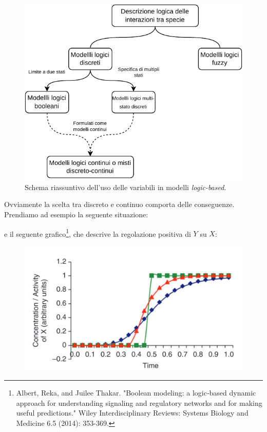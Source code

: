 \documentclass[a4paper,12pt, oneside]{book}
\begin{document}
\begin{figure}
  \centering
  \includegraphics[scale = 1]{img/log.pdf}
  \caption{Schema riassuntivo dell'uso delle variabili in modelli
    \textit{logic-based}.}
  \label{fig:log}
\end{figure}
\newpage
\noindent
Ovviamente la scelta tra discreto e continuo comporta delle
conseguenze. Prendiamo ad esempio la seguente situazione:
\begin{center}
\end{center}
e il seguente grafico\footnote{Albert, Reka, and
  Juilee Thakar. "Boolean modeling: a logic‐based dynamic approach for
  understanding signaling and regulatory networks and for making useful
  predictions." Wiley Interdisciplinary Reviews: Systems Biology and Medicine
  6.5 (2014): 353-369.}, che descrive la regolazione positiva di $Y$ su $X$: 
\begin{figure}[H]
  \centering
  \includegraphics[scale = 0.2]{img/boolf.jpg}
\end{figure}
\end{document}
